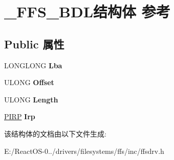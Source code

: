 \hypertarget{struct___f_f_s___b_d_l}{}\section{\+\_\+\+F\+F\+S\+\_\+\+B\+D\+L结构体 参考}
\label{struct___f_f_s___b_d_l}
\subsection*{Public 属性}
\begin{DoxyCompactItemize}
\item 
\mbox{\label{struct___f_f_s___b_d_l_a41f7d4a9893d83467080755fc88df007}} 
L\+O\+N\+G\+L\+O\+NG {\bfseries Lba}
\item 
\mbox{\label{struct___f_f_s___b_d_l_afc4d37d12de4fd6dfeb759d77b361968}} 
U\+L\+O\+NG {\bfseries Offset}
\item 
\mbox{\label{struct___f_f_s___b_d_l_a7cfe4fcda60cb8df2bdd7fd3f4d477dc}} 
U\+L\+O\+NG {\bfseries Length}
\item 
\mbox{\label{struct___f_f_s___b_d_l_a3eff784282cb30339c608fcc979d7e98}} 
\hyperlink{interfacevoid}{P\+I\+RP} {\bfseries Irp}
\end{DoxyCompactItemize}


该结构体的文档由以下文件生成\+:\begin{DoxyCompactItemize}
\item 
E\+:/\+React\+O\+S-\/0../drivers/filesystems/ffs/inc/ffsdrv.\+h\end{DoxyCompactItemize}
